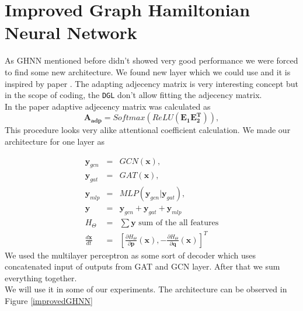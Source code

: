\section{Improved Graph Hamiltonian Neural Network}
As GHNN mentioned before didn't showed  very good performance we were forced to find some new architecture. We found new layer which we could use and it is inspired by paper \cite{wave}. The adapting adjecency matrix is very interesting concept but in the scope of coding, the \texttt{DGL} don't allow fitting the adjecency matrix.\\
In the paper adaptive adjecency matrix was calculated as
\begin{equation}
	\mathbf{A_{adp}} = Softmax(ReLU(\mathbf{E_1}\mathbf{E_2^T})),
\end{equation}
This procedure looks very alike attentional coefficient calculation.
We made our architecture for one layer as

\begin{eqnarray}
	\mathbf{y}_{gcn} &=& GCN(\mathbf{x}),\\
	\mathbf{y}_{gat} &=& GAT(\mathbf{x}),\\
	\mathbf{y}_{mlp} &=& MLP(\mathbf{y}_{gcn}|\mathbf{y}_{gat}),\\
	\mathbf{y} &=& \mathbf{y}_{gcn}+\mathbf{y}_{gat}+\mathbf{y}_{mlp}\\
	H_{\Theta} &=& \sum \mathbf{y} \text{   sum of the all features}\\
	\frac{d\mathbf{x}}{dt} &=& \left[\frac{\partial H_{\Theta}}{\partial\mathbf{p}}(\mathbf{x}),-\frac{\partial H_{\Theta}}{\partial\mathbf{q}}(\mathbf{x})\right]^T
\end{eqnarray}
We used the multilayer perceptron as some sort of decoder which uses concatenated input of outputs from GAT and GCN layer. After that we sum everything together.\\
We will use it in some of our experiments. The architecture can be observed in Figure \ref{improvedGHNN}

